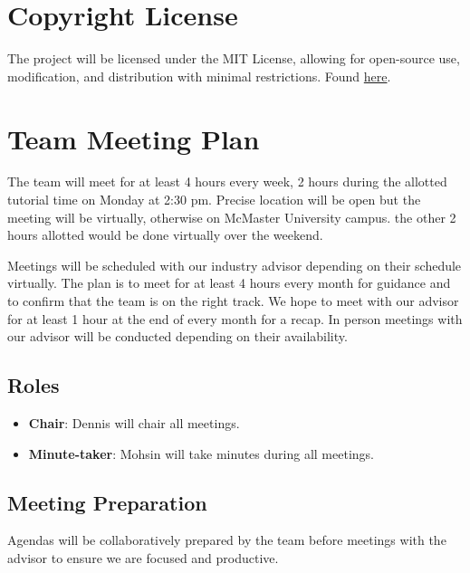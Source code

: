 \documentclass{article}
\begin{document}

\section{Copyright License}
The project will be licensed under the MIT License, allowing for open-source use, modification, 
and distribution with minimal restrictions. Found \href{https://github.com/lilweege/SyntaxSentinels/blob/main/LICENSE}{here}.

\section{Team Meeting Plan}

The team will meet for at least 4 hours every week, 2 hours during the allotted tutorial 
time on Monday at 2:30 pm. Precise location will be open but the meeting will be virtually, 
otherwise on McMaster University campus. the other 2 hours allotted would be done virtually over the weekend.


Meetings will be scheduled with our industry advisor depending on their schedule virtually. 
The plan is to meet for at least 4 hours every month for guidance and to confirm that the team 
is on the right track. We hope to meet with our advisor for at least 1 hour at the end of every 
month for a recap. In person meetings with our advisor will be conducted depending on their availability.

\subsection*{Roles}

\begin{itemize}
    \item \textbf{Chair}: Dennis will chair all meetings.
    \item \textbf{Minute-taker}: Mohsin will take minutes during all meetings.
\end{itemize}

\subsection*{Meeting Preparation}

Agendas will be collaboratively prepared by the team before meetings with the advisor to 
ensure we are focused and productive.
\end{document}
